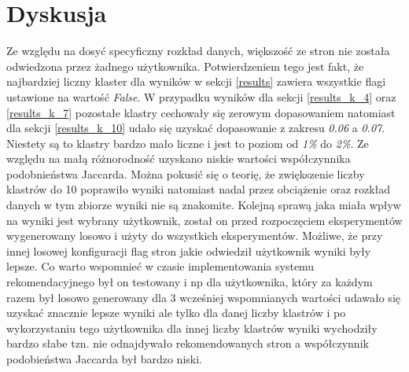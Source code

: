 \documentclass{classrep}
\begin{document}
    \section{Dyskusja} {
        Ze względu na dosyć specyficzny rozkład danych, większość ze stron nie została
        odwiedzona przez żadnego użytkownika. Potwierdzeniem tego jest fakt, że
        najbardziej liczny klaster dla wyników w sekcji \ref{results} zawiera wszystkie
        flagi ustawione na wartość \textit{False}. W przypadku wyników dla sekcji
        \ref{results_k_4} oraz \ref{results_k_7} pozostałe klastry cechowały się
        zerowym dopasowaniem natomiast dla sekcji \ref{results_k_10} udało się uzyskać
        dopasowanie z zakresu \textit{0.06} a \textit{0.07}. Niestety są to klastry
        bardzo mało liczne i jest to poziom od \textit{1\%} do \textit{2\%}. Ze względu
        na małą różnorodność uzyskano niskie wartości współczynnika podobnieństwa
        Jaccarda.
        Można pokusić się o teorię, że zwiększenie liczby klastrów do 10 poprawiło
        wyniki natomiast nadal przez obciążenie oraz rozkład danych w tym zbiorze
        wyniki nie są znakomite. Kolejną sprawą jaka miała wpływ na wyniki jest wybrany
        użytkownik, został on przed rozpoczęciem eksperymentów wygenerowany losowo i
        użyty do wszystkich eksperymentów. Możliwe, że przy innej losowej konfiguracji
        flag stron jakie odwiedził użytkownik wyniki były lepsze. Co warto wspomnieć w
        czasie implementowania systemu rekomendacyjnego był on testowany i np dla
        użytkownika, który za każdym razem był losowo generowany dla 3 wcześniej
        wspomnianych wartości udawało się uzyskać znacznie lepsze wyniki ale tylko dla
        danej liczby klastrów i po wykorzystaniu tego użytkownika dla innej liczby
        klastrów wyniki wychodziły bardzo słabe tzn. nie odnajdywało rekomendowanych
        stron a współczynnik podobieństwa Jaccarda był bardzo niski.
    }

    \begin{thebibliography}{0}
    \end{thebibliography}
\end{document}
